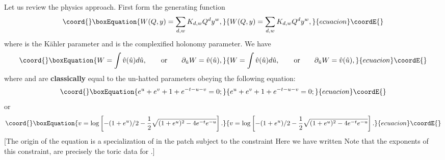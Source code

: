 \documentclass[a4paper,11pt]{article}
\providecommand{\PP}{{\mathbb{P}}}
\begin{document}
Let us review the physics approach.  
First form the generating function
\begin{equation}\coord{}\boxEquation{
\label{gwgenfun}
W(Q,y) = \sum_{d,w} K_{d,w} Q^d y^w,
}{
W(Q,y) = \sum_{d,w} K_{d,w} Q^d y^w,
}{ecuacion}\coordE{}\end{equation}
where \coordHE{} is
the K\"ahler parameter
and \coordHE{} is the complexified
holonomy parameter.
%
We have
\begin{equation}\coord{}\boxEquation{
W = \int \hat{v}(\hat{u}) d\hat{u},\qquad {\rm or}\qquad
\partial_{\hat{u}} W = \hat{v}(\hat{u}),
}{
W = \int \hat{v}(\hat{u}) d\hat{u},\qquad {\rm or}\qquad
\partial_{\hat{u}} W = \hat{v}(\hat{u}),
}{ecuacion}\coordE{}\end{equation}
where
\coordHE{} and \coordHE{}
are {\bf classically} equal to the
un-hatted parameters
obeying the following equation:
\begin{equation}\coord{}\boxEquation{
\label{cpxeq}
e^u + e^v + 1 + e^{-t - u - v} = 0;
}{
e^u + e^v + 1 + e^{-t - u - v} = 0;
}{ecuacion}\coordE{}\end{equation}
or
\begin{equation}\coord{}\boxEquation{
\label{cpxeqsol}
v =
\log\left[-(1+e^u)/2 - \frac{1}{2}
\sqrt{(1+e^u)^2-4e^{-t}e^{-u}}\right].
}{
v =
\log\left[-(1+e^u)/2 - \frac{1}{2}
\sqrt{(1+e^u)^2-4e^{-t}e^{-u}}\right].
}{ecuacion}\coordE{}\end{equation}
[The origin of the equation is a specialization
of \coordHE{} in the patch
\coordHE{} subject to the constraint
\coordHE{}
Here we have written \coordHE{}
Note that the exponents of this constraint, \coordHE{}
are precisely the toric data for \myHighlight{$K_{\PP^2}$}\coordHE{}.]
\end{document}
